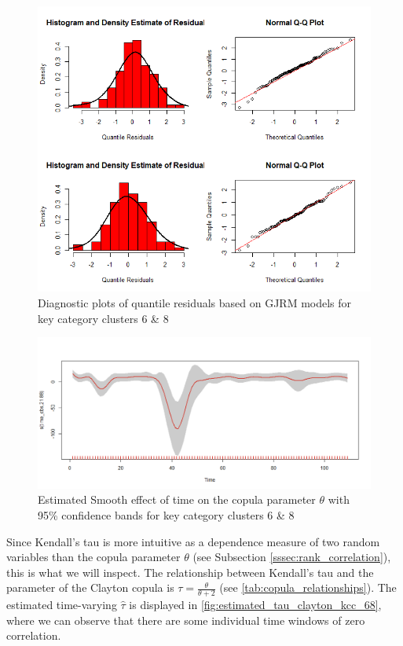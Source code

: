\begin{figure}[H]
\centering
  \includegraphics[width=0.95\linewidth]{figures/res_hist_qqplot_68.png}
  \caption{Diagnostic plots of quantile residuals based on \ac{GJRM} models for key category clusters 6 \& 8}
  \label{fig:res_hist_qqplot_68}
\end{figure}




\begin{figure}[H]
\centering
  \includegraphics[width=0.95\linewidth]{figures/time_effect_on_theta_68.png}
  \caption{Estimated Smooth effect of time on the copula parameter $\theta$ with 95\% confidence bands for key category clusters 6 \& 8}
  \label{fig:time_effect_on_theta_68}
\end{figure}



Since Kendall's tau is more intuitive as a dependence measure of two random variables than the copula parameter $\theta$ (see Subsection \ref{sssec:rank_correlation}), this is what we will inspect. The relationship between Kendall's tau and the parameter of the Clayton copula is $\tau = \frac{\theta}{\theta + 2}$ (see \autoref{tab:copula_relationships}). The estimated time-varying $\hat{\tau}$ is displayed in \autoref{fig:estimated_tau_clayton_kcc_68}, where we can observe that 
there are some individual time windows of zero correlation.\\

